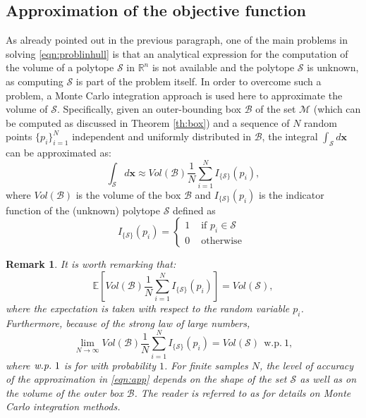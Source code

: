 \documentclass[twocolumn]{autart}
\newtheorem{remark}{Remark}{\normalfont}{\normalfont}
\newcommand{\DP}[1]{{#1}}
\begin{document}
\subsection{Approximation of the objective function} \label{susec:area}
As already pointed out in the previous paragraph, one of the main problems in solving \eqref{eqn:problinhull} is that an analytical expression for the computation of  the volume of a polytope $\mathcal{S}$ in $\mathbb{R}^n$ is not available   and the polytope $\mathcal{S}$ is unknown, as  computing $\mathcal{S}$ is part of  the problem itself.
In order to overcome such a problem, a Monte Carlo integration approach \cite{robert2004monte} is used here to approximate the volume of   $\mathcal{S}$. Specifically, given an outer-bounding box $\mathcal{B}$ of the set $\mathcal{M}$ (which can be computed as discussed in Theorem \ref{th:box}) and a sequence of $N$ random points $\{p_i\}_{i=1}^N$ \DP{independent and} uniformly distributed in $\mathcal{B}$, the integral  $\int_\mathcal{S} d\mathbf{x}$ can be approximated as:
\begin{equation} \label{eqn:app}
\int_\mathcal{S} d\mathbf{x} \approx Vol(\mathcal{B})\frac{1}{N}\sum_{i=1}^N I_{\{\mathcal{S}\}}(p_i),
\end{equation}
where $Vol(\mathcal{B})$ is the volume of the box  $\mathcal{B}$ and $I_{\{\mathcal{S}\}}(p_i)$ is the indicator function of the (unknown) polytope $\mathcal{S}$ defined as
\begin{equation}
I_{\{\mathcal{S}\}}(p_i) = \left\{\begin{array}{lll}
                                    1 & \mbox{ if }  p_i \in  \mathcal{S}\\
                                    0 & \mbox{ otherwise }
                                  \end{array}
\right.
\end{equation}

\begin{remark}
It is worth remarking that:
$$\mathbb{E}\left[Vol(\mathcal{B})\frac{1}{N}\sum_{i=1}^N I_{\{\mathcal{S}\}}(p_i)\right]=Vol(\mathcal{S}),$$
\DP{where the expectation is taken \DP{with respect to} the random variable $p_i$.
 Furthermore,} because of the strong law of large numbers,
\begin{equation}
\lim_{N \rightarrow \infty}Vol(\mathcal{B})\frac{1}{N}\sum_{i=1}^N I_{\{\mathcal{S}\}}(p_i)=Vol(\mathcal{S}) \ \ \mathrm{w.p.}\  1,
\end{equation}
\DP{where $\mathrm{\emph{w.p.}}\ 1$ is for \emph{with probability} $1$.} {For finite samples $N$, the level of  accuracy 
of the approximation in \eqref{eqn:app} depends on the shape of the set $\mathcal{S}$ as well as on the volume of the 
outer box $\mathcal{B}$.}
The reader is referred to \DP{as} \cite{robert2004monte} for details on Monte Carlo integration methods.
\end{remark}
\end{document}
